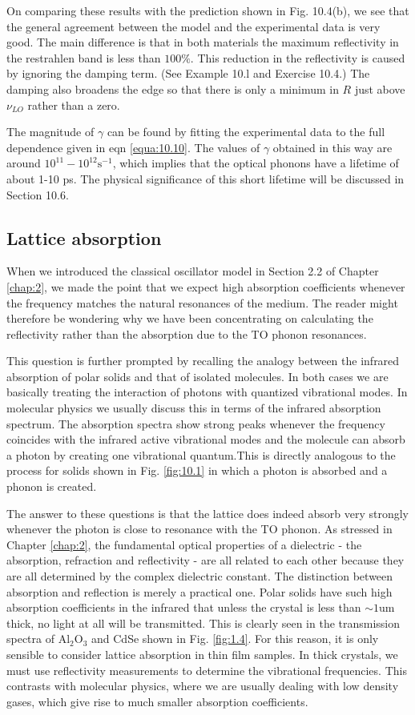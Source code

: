 \documentclass[12pt]{book}
\def\um{\mathrm{um}}
\begin{document}
{On comparing these results with the prediction shown in Fig. 10.4(b), we see that the general agreement between the model and the experimental data is very good. The main difference is that in both materials the maximum reflectivity in the restrahlen band is less than $100\%$. This reduction in the reflectivity is caused by ignoring the damping term. (See Example 10.l and Exercise 10.4.) The damping also broadens the edge so that there is only a minimum in $R$ just above $\nu_{LO}$ rather than a zero.

The magnitude of $\gamma$ can be found by fitting the experimental data to the full dependence given in eqn \ref{equa:10.10}. The values of $\gamma$ obtained in this way are around $10^{11}-10^{12}\mathrm{s^{-1}}$, which implies that the optical phonons have a lifetime of about 1-10 ps. The physical significance of this short lifetime will be discussed in Section 10.6.

\subsection{Lattice absorption}
When we introduced the classical oscillator model in Section 2.2 of Chapter \ref{chap:2}, we made the point that we expect high absorption coefficients whenever the frequency matches the natural resonances of the medium. The reader might therefore be wondering why we have been concentrating on calculating the reflectivity rather than the absorption due to the TO phonon resonances.

This question is further prompted by recalling the analogy between the infrared absorption of polar solids and that of isolated molecules. In both cases we are basically treating the interaction of photons with quantized vibrational modes. In molecular physics we usually discuss this in terms of the infrared absorption spectrum. The absorption spectra show strong peaks whenever the frequency coincides with the infrared active vibrational modes and the molecule can absorb a photon by creating one vibrational quantum.This is directly analogous to the process for solids shown in Fig. \ref{fig:10.1} in which a photon is absorbed and a phonon is created.

The answer to these questions is that the lattice does indeed absorb very strongly whenever the photon is close to resonance with the TO phonon. As stressed in Chapter \ref{chap:2}, the fundamental optical properties of a dielectric - the absorption, refraction and reflectivity - are all related to each other because they are all determined by the complex dielectric constant. The distinction between absorption and reflection is merely a practical one. Polar solids have such high absorption coefficients in the infrared that unless the crystal is less than $\sim1\um$ thick, no light at all will be transmitted. This is clearly seen in the transmission spectra of $\mathrm{Al_2O_3}$ and CdSe shown in Fig. \ref{fig:1.4}. For this reason, it is only sensible to consider lattice absorption in thin film samples. In thick crystals, we must use reflectivity measurements to determine the vibrational frequencies. This contrasts with molecular physics, where we are usually dealing with low density gases, which give rise to much smaller absorption coefficients.

}
\end{document}
